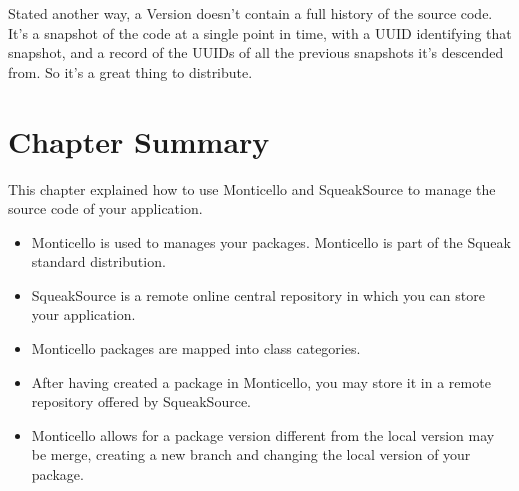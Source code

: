 \documentclass[a4paper,10pt,twoside]{book}
\begin{document}
Stated another way, a Version doesn't contain a full history of the source code. It's a snapshot of the code at a single point in time, with a UUID identifying that snapshot, and a record of the UUIDs of all the previous snapshots it's descended from. So it's a great thing to distribute.

\section{Chapter Summary}

This chapter explained how to use Monticello and SqueakSource to manage the source code of your application.

\begin{itemize}
\item Monticello is used to manages your packages. Monticello is part of the Squeak standard distribution.

\item SqueakSource is a remote online central repository in which you can store your application.

\item Monticello packages are mapped into class categories. 

\item After having created a package in Monticello, you may store it in a remote repository offered by SqueakSource.

\item Monticello allows for a package version different from the local version may be merge, creating a new branch and changing the local version of your package.
\end{itemize}



\end{document}
